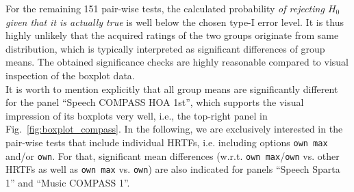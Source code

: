 \documentclass[conference]{IEEEtran}
\def\NewL{\\\noindent\hspace*{5mm}}
\begin{document}
%
For the remaining 151 pair-wise tests, the calculated probability \textit{of rejecting $H_0$ given that it is actually true} is well below the chosen type-I error level.
%
It is thus highly unlikely that the acquired ratings of the two groups originate from same distribution, which is typically interpreted as significant differences of group means.
%
The obtained significance checks are highly reasonable compared to visual inspection of the boxplot data.
%
\NewL It is worth to mention explicitly that all group means are significantly different for the panel ``Speech COMPASS HOA 1st'', which supports the visual impression of its boxplots very well, i.e., the top-right panel in Fig.~\ref{fig:boxplot_compass}.
%
In the following, we are exclusively interested in the pair-wise tests that include individual HRTFs, i.e. including options \texttt{own max} and/or \texttt{own}.
%
For that, significant mean differences (w.r.t. \texttt{own max}/\texttt{own} vs. other HRTFs as well as \texttt{own max} vs. \texttt{own}) are also indicated for panels \quad ``Speech Sparta 1'' \quad and \quad ``Music COMPASS 1''.
\end{document}
